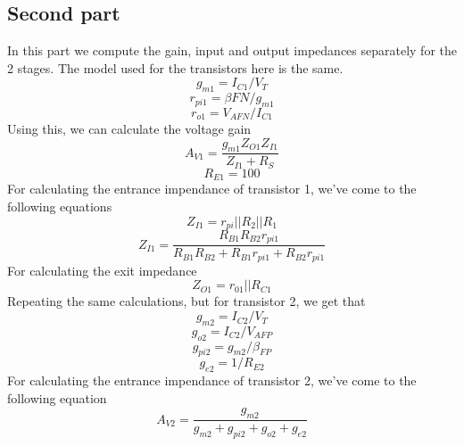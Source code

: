 \subsection{Second part}
In this part we compute the gain, input and output impedances separately for the 2 stages.
The model used for the transistors here is the same.
\begin{equation*}
   g_{m1} = I_{C1}/V_T
\end{equation*}
\begin{equation*}
    r_{pi1} = \beta{FN}/g_{m1}
\end{equation*}
\begin{equation*}
    r_{o1} = V_{AFN}/I_{C1}
\end{equation*}
Using this, we can calculate the voltage gain 
\begin{equation*}
    A_{V1} = \frac{g_{m1} Z_{O1} Z_{I1}}{Z_{I1}+R_{S}}
\end{equation*}
\begin{equation*}
    R_{E1} = 100
\end{equation*}
For calculating the entrance impendance of transistor 1, we've come to the following equations
\begin{equation*}
    Z_{I1} = r_{pi} || R_{2} || R_{1}
\end{equation*}
\begin{equation*}
    Z_{I1} = \frac{R_{B1} R_{B2} r_{pi1}}{R_{B1} R_{B2}+ R_{B1} r_{pi1}+ R_{B2} r_{pi1}}
\end{equation*}
For calculating the exit impedance
\begin{equation*}
    Z_{O1} = r_{01} || R_{C1}
\end{equation*}
Repeating the same calculations, but for transistor 2, we get that
\begin{equation*}
    g_{m2} = I_{C2}/V_{T}
\end{equation*}
\begin{equation*}
    g_{o2} = I_{C2}/V_{AFP}
\end{equation*}
\begin{equation*}
    g_{pi2} = g_{m2}/\beta_{FP}
\end{equation*}
\begin{equation*}
    g_{e2} = 1/R_{E2}
\end{equation*}
For calculating the entrance impendance of transistor 2, we've come to the following equation
\begin{equation*}
    A_{V2} = \frac{g_{m2}}{g_{m2}+g_{pi2}+g_{o2}+g_{e2}}
\end{equation*}
